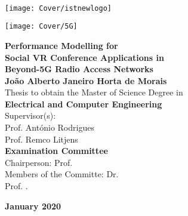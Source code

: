 \setcounter{page}{1} 


\thispagestyle{empty}
\begin{flushleft} ~\\ \vspace{-12mm} \hspace{-12mm}  \texttt{[image: Cover/istnewlogo]} 
\vspace{10mm}
\\ \begin{center} \texttt{[image: Cover/5G]}  \end{center} %
 \vspace{5mm}
\centering
\LARGE \textbf{Performance Modelling for \\Social VR Conference Applications in\\Beyond-5G Radio Access Networks}
\\ \vspace{15mm}
\Large \textbf{Jo{\~a}o Alberto Janeiro Horta de Morais} \\
\vspace{15mm}
\large Thesis to obtain the Master of Science Degree in
\\ \vspace{2mm}
\LARGE \textbf{Electrical and Computer Engineering}
\\ \vspace{10mm}
\large Supervisor(s): \\Prof. Ant{\'o}nio Rodrigues\\ Prof. Remco Litjens
\\ \vspace{10mm}
\Large \textbf{Examination Committee}
\\ \vspace{5mm}
\large Chairperson:	Prof.  \\
\large Members of the Committe: Dr. \\
Prof. .
 

\Large \textbf{January 2020} \\
\let\thepage\relax
\end{flushleft}
\pagebreak


